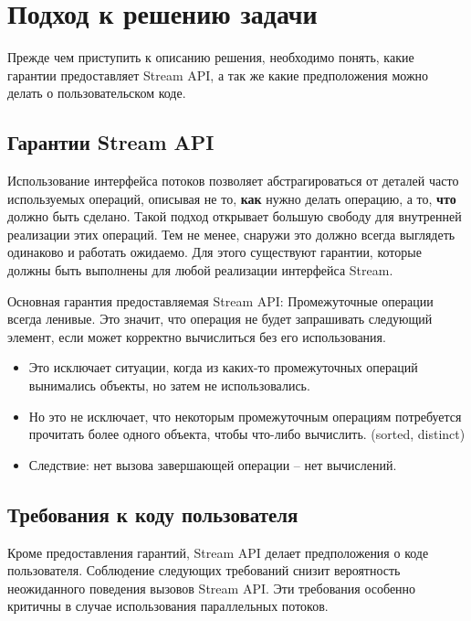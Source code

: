 \section{Подход к решению задачи}\label{chapter2}
Прежде чем приступить к описанию решения, необходимо понять, какие гарантии предоставляет Stream API, а так же какие предположения можно делать о пользовательском коде.

\subsection{Гарантии Stream API}\label{java:guarantees}
Использование интерфейса потоков позволяет абстрагироваться от деталей часто используемых операций, описывая не то, \textbf{как} нужно делать операцию, а то, \textbf{что} должно быть сделано. Такой подход открывает большую свободу для внутренней реализации этих операций. Тем не менее, снаружи это должно всегда выглядеть одинаково и работать ожидаемо. Для этого существуют гарантии, которые должны быть выполнены для любой реализации интерфейса Stream. 

Основная гарантия предоставляемая Stream API: Промежуточные операции всегда ленивые. Это значит, что операция не будет запрашивать следующий элемент, если может корректно вычислиться без его использования.
\begin{itemize}
	\item Это исключает ситуации, когда из каких-то промежуточных операций вынимались объекты, но затем не использовались.
	\item Но это не исключает, что некоторым промежуточным операциям потребуется прочитать более одного объекта, чтобы что-либо вычислить. (sorted, distinct)
	\item Следствие: нет вызова завершающей операции -- нет вычислений.
\end{itemize}

\subsection{Требования к коду пользователя} \label{code:demands}

Кроме предоставления гарантий, Stream API делает предположения о коде пользователя. Соблюдение следующих требований снизит вероятность неожиданного поведения вызовов Stream API. Эти требования особенно критичны в случае использования параллельных потоков.

